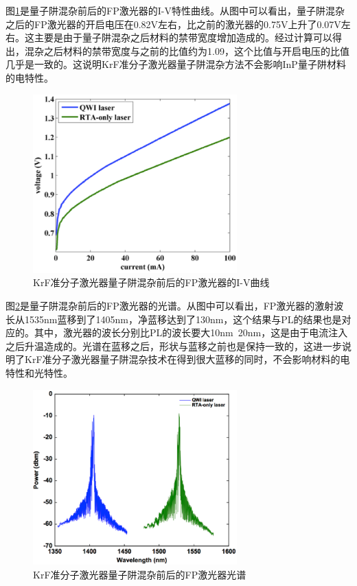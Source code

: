 \documentclass{ZJUthesis}
\begin{document}
图\ref{fig_fp_iv}是量子阱混杂前后的FP激光器的I-V特性曲线。从图中可以看出，量子阱混杂之后的FP激光器的开启电压在0.82V左右，比之前的激光器的0.75V上升了0.07V左右。这主要是由于量子阱混杂之后材料的禁带宽度增加造成的。经过计算可以得出，混杂之后材料的禁带宽度与之前的比值约为1.09，这个比值与开启电压的比值几乎是一致的。这说明KrF准分子激光器量子阱混杂方法不会影响InP量子阱材料的电特性。

\begin{figure}[!t]
    \centering
    \includegraphics[width=0.7\textwidth]{./Pictures/fp_iv.eps}
    \caption{KrF准分子激光器量子阱混杂前后的FP激光器的I-V曲线}
    \label{fig_fp_iv}
\end{figure}

图\ref{fig_fp_spectra}是量子阱混杂前后的FP激光器的光谱。从图中可以看出，FP激光器的激射波长从1535nm蓝移到了1405nm，净蓝移达到了130nm，这个结果与PL的结果也是对应的。其中，激光器的波长分别比PL的波长要大10nm~20nm，这是由于电流注入之后升温造成的。光谱在蓝移之后，形状与蓝移之前也是保持一致的，这进一步说明了KrF准分子激光器量子阱混杂技术在得到很大蓝移的同时，不会影响材料的电特性和光特性。

\begin{figure}[!t]
    \centering
    \includegraphics[width=0.7\textwidth]{./Pictures/fp_spectra.eps}
    \caption{KrF准分子激光器量子阱混杂前后的FP激光器光谱}
    \label{fig_fp_spectra}
\end{figure}
\end{document}
